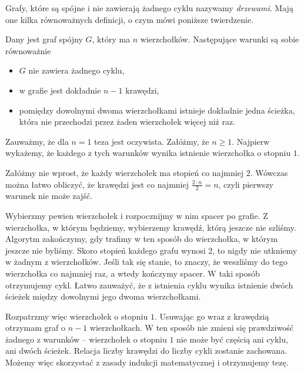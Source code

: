 \vspace{10px}

\noindent
Grafy, które są spójne i nie zawierają żadnego cyklu nazywamy \textit{drzewami}. Mają one kilka równoważnych definicji, o czym mówi poniższe twierdzenie.

\vspace{5px}


\noindent
Dany jest graf spójny $G$, który ma $n$ wierzchołków. Następujące warunki są sobie równoważnie
\begin{itemize}
    \item $G$ nie zawiera żadnego cyklu,
    \item w grafie jest dokładnie $n - 1$ krawędzi,
    \item pomiędzy dowolnymi dwoma wierzchołkami istnieje dokładnie jedna ścieżka, która nie przechodzi przez żaden wierzchołek więcej niż raz.
\end{itemize}


\noindent
Zauważmy, że dla $n = 1$ teza jest oczywista. Załóżmy, że $n \geqslant 1$. Najpierw wykażemy, że każdego z tych warunków wynika istnienie wierzchołka o stopniu $1$.

Załóżmy nie wprost, że każdy wierzchołek ma stopień co najmniej $2$. Wówczas można łatwo obliczyć, że krawędzi jest co najmniej $\frac{2 \cdot n}{2} = n$, czyli pierwszy warunek nie może zajść.

Wybierzmy pewien wierzchołek i rozpocznijmy w nim spacer po grafie. Z wierzchołka, w którym będziemy, wybierzemy krawędź, którą jeszcze nie szliśmy. Algorytm zakończymy, gdy trafimy w ten sposób do wierzchołka, w którym jeszcze nie byliśmy. Skoro stopień każdego grafu wynosi $2$, to nigdy nie utkniemy w żadnym z wierzchołków. Jeśli tak się stanie, to znaczy, że weszliśmy do tego wierzchołka co najmniej raz, a wtedy kończymy spacer. W taki sposób otrzymujemy cykl. Łatwo zauważyć, że z istnienia cyklu wynika istnienie dwóch ścieżek między dowolnymi jego dwoma wierzchołkami.

Rozpatrzmy więc wierzchołek o stopniu $1$. Usuwając go wraz z krawędzią otrzymam graf o $n - 1$ wierzchołkach. W ten sposób nie zmieni się prawdziwość żadnego z warunków -- wierzchołek o stopniu $1$ nie może być częścią ani cyklu, ani dwóch ścieżek. Relacja liczby krawędzi do liczby cykli zostanie zachowana. Możemy więc skorzystać z zasady indukcji matematycznej i otrzymujemy tezę.

